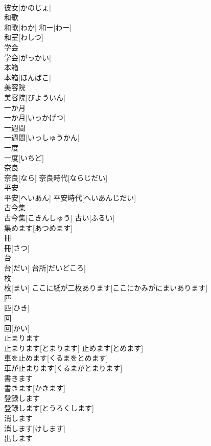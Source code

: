 \documentclass[8pt]{extreport}
\begin{document}
\begin{CJK}{UTF8}{min}
\\	彼女[かのじょ]	
\\	和歌	
\\	和歌[わか]	和ー[わー] 
\\	和室[わしつ] 
\\	学会	
\\	学会[がっかい]	
\\	本箱	
\\	本箱[ほんばこ]	
\\	美容院	
\\	美容院[びよういん]	
\\	一か月	
\\	一か月[いっかげつ]	
\\	一週間	
\\	一週間[いっしゅうかん]	
\\	一度	
\\	一度[いちど]	
\\	奈良	
\\	奈良[なら]	奈良時代[ならじだい] 
\\	平安	
\\	平安[へいあん]	平安時代[へいあんじだい] 
\\	古今集	
\\	古今集[こきんしゅう]	古い[ふるい] 
\\	集めます[あつめます] 
\\	冊	
\\	冊[さつ]	
\\	台	
\\	台[だい]	台所[だいどころ] 
\\	枚	
\\	枚[まい]	ここに紙が二枚あります[ここにかみがにまいあります] 
\\	匹	
\\	匹[ひき]	
\\	回	
\\	回[かい]	
\\	止まります	
\\	止まります[とまります]	止めます[とめます] 
\\	車を止めます[くるまをとめます] 
\\	車が止まります[くるまがとまります] 
\\	書きます	
\\	書きます[かきます]	
\\	登録します	
\\	登録します[とうろくします]	
\\	消します	
\\	消します[けします]	
\\	出します	

\end{CJK}
\end{document}
